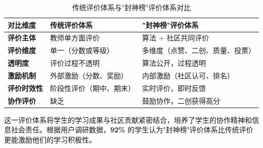 \documentclass[12pt,a4paper,fontset=fandol]{ctexart}
\begin{document}
\begin{table}[H]
    \centering
    \caption{传统评价体系与"封神榜"评价体系对比}
    \label{tab:evaluation-comparison}
    \begin{tabular}{p{2.5cm}p{4cm}p{4cm}}
        \toprule
        \textbf{对比维度} & \textbf{传统评价体系} & \textbf{"封神榜"评价体系} \\
        \midrule
        \textbf{评价主体} & 教师单方面评价 & 算法 + 社区共同评价 \\
        \midrule
        \textbf{评价维度} & 单一（分数或等级） & 多维度（点赞、二创、质量、投票） \\
        \midrule
        \textbf{透明度} & 评价过程不透明 & 算法公开，过程透明 \\
        \midrule
        \textbf{激励机制} & 外部激励（分数、奖励） & 内部激励（社区认可、排名） \\
        \midrule
        \textbf{评价时效性} & 阶段性评价（期中、期末） & 实时评价，即时反馈 \\
        \midrule
        \textbf{协作评价} & 缺乏 & 鼓励协作，二创获得高分 \\
        \bottomrule
    \end{tabular}
\end{table}

这一评价体系将学生的学习成果与社区贡献紧密结合，培养了学生的协作精神和信息社会责任。根据用户调研数据，\textbf{92\%} 的学生认为"封神榜"评价体系比传统评价更能激励他们的学习积极性。
\end{document}
